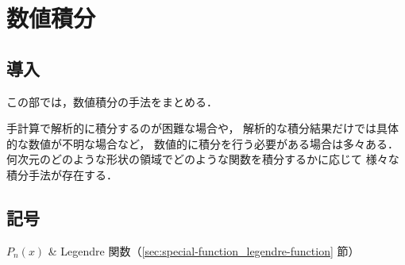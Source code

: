 %

\part{数値積分}

\chapter{導入}

この部では，数値積分の手法をまとめる．

手計算で解析的に積分するのが困難な場合や，
解析的な積分結果だけでは具体的な数値が不明な場合など，
数値的に積分を行う必要がある場合は多々ある．
何次元のどのような形状の領域でどのような関数を積分するかに応じて
様々な積分手法が存在する．

\chapter{記号}

\begin{explainlist}
    $P_n(x)$ & Legendre 関数（\ref{sec:special-function_legendre-function} 節） \\
\end{explainlist}



